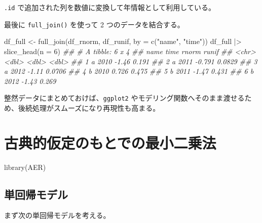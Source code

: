 \documentclass[
  letterpaper,
  xelatex,
  ja=standard, xelatex]{bxjsbook}
\newenvironment{Shaded}{\begin{snugshade}}{\end{snugshade}}
\newcommand{\AttributeTok}[1]{\textcolor[rgb]{0.40,0.45,0.13}{#1}}
\newcommand{\DecValTok}[1]{\textcolor[rgb]{0.68,0.00,0.00}{#1}}
\newcommand{\DocumentationTok}[1]{\textcolor[rgb]{0.37,0.37,0.37}{\textit{#1}}}
\newcommand{\FunctionTok}[1]{\textcolor[rgb]{0.28,0.35,0.67}{#1}}
\newcommand{\NormalTok}[1]{\textcolor[rgb]{0.00,0.23,0.31}{#1}}
\newcommand{\OtherTok}[1]{\textcolor[rgb]{0.00,0.23,0.31}{#1}}
\newcommand{\SpecialCharTok}[1]{\textcolor[rgb]{0.37,0.37,0.37}{#1}}
\newcommand{\StringTok}[1]{\textcolor[rgb]{0.13,0.47,0.30}{#1}}
\begin{document}
\texttt{.id} で追加された列を数値に変換して年情報として利用している。

最後に \texttt{full\_join()} を使って 2 つのデータを結合する。

\begin{Shaded}
\begin{Highlighting}[]
\NormalTok{df\_full }\OtherTok{\textless{}{-}} \FunctionTok{full\_join}\NormalTok{(df\_rnorm, df\_runif, }\AttributeTok{by =} \FunctionTok{c}\NormalTok{(}\StringTok{"name"}\NormalTok{, }\StringTok{"time"}\NormalTok{))}
\NormalTok{df\_full }\SpecialCharTok{|\textgreater{}} \FunctionTok{slice\_head}\NormalTok{(}\AttributeTok{n =} \DecValTok{6}\NormalTok{)}
\DocumentationTok{\#\# \# A tibble: 6 x 4}
\DocumentationTok{\#\#   name   time  rnorm  runif}
\DocumentationTok{\#\#   \textless{}chr\textgreater{} \textless{}dbl\textgreater{}  \textless{}dbl\textgreater{}  \textless{}dbl\textgreater{}}
\DocumentationTok{\#\# 1 a      2010 {-}1.46  0.191 }
\DocumentationTok{\#\# 2 a      2011 {-}0.791 0.0829}
\DocumentationTok{\#\# 3 a      2012 {-}1.11  0.0706}
\DocumentationTok{\#\# 4 b      2010  0.726 0.475 }
\DocumentationTok{\#\# 5 b      2011 {-}1.47  0.431 }
\DocumentationTok{\#\# 6 b      2012 {-}1.43  0.269}
\end{Highlighting}
\end{Shaded}

整然データにまとめておけば、\texttt{ggplot2}
やモデリング関数へそのまま渡せるため、後続処理がスムーズになり再現性も高まる。


\chapter{古典的仮定のもとでの最小二乗法}\label{ux53e4ux5178ux7684ux4eeeux5b9aux306eux3082ux3068ux3067ux306eux6700ux5c0fux4e8cux4e57ux6cd5}

\begin{Shaded}
\begin{Highlighting}[]
\FunctionTok{library}\NormalTok{(AER)}
\end{Highlighting}
\end{Shaded}

\section{単回帰モデル}\label{ux5358ux56deux5e30ux30e2ux30c7ux30eb}

まず次の単回帰モデルを考える。
\end{document}

